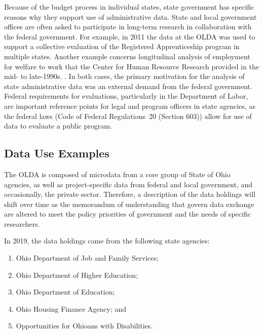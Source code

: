 Because of the budget process in individual states, state government has specific reasons why they support use of administrative data. State and local government offices are often asked to participate in long-term research in collaboration with the federal government. For example, in 2011 the data at the OLDA was used to support a collective evaluation of the Registered Apprenticeship program in multiple states. Another example concerns longitudinal analysis of employment for welfare to work that the Center for Human Resource Research provided in the mid- to late-1990s. \citep{centerforhumanresourceresearch2001, reed2012}. In both cases, the primary motivation for the analysis of state administrative data was an external demand from the federal government. Federal requirements for evaluations, particularly in the Department of Labor, are important reference points for legal and program officers in state agencies, as the federal laws (Code of Federal Regulations~20 (Section 603)) allow for use of data to evaluate a public program.

\hypertarget{data-use-examples-1}{%
\subsection{Data Use Examples}\label{data-use-examples-1}}

The OLDA is composed of microdata from a core group of State of Ohio agencies, as well as project-specific data from federal and local government, and occasionally, the private sector. Therefore, a description of the data holdings will shift over time as the memorandum of understanding that govern data exchange are altered to meet the policy priorities of government and the needs of specific researchers.

In 2019, the data holdings came from the following state agencies:

\begin{enumerate}
\def\labelenumi{\arabic{enumi}.}
\tightlist
\item
  Ohio Department of Job and Family Services;
\item
  Ohio Department of Higher Education;
\item
  Ohio Department of Education;
\item
  Ohio Housing Finance Agency; and
\item
  Opportunities for Ohioans with Disabilities.
\end{enumerate}

